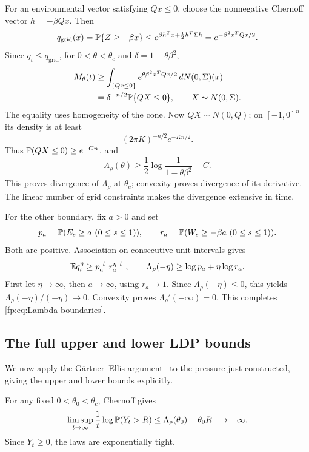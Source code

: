 For an environmental vector satisfying $Qx\le0$, choose the nonnegative Chernoff vector $h=-\beta Qx$. Then
\begin{equation}\label{fp:eq:chernoff-cone}
 q_{\mathrm{grid}}(x)=\mathbb P\{Z\ge-\beta x\}
 \le e^{\beta h^Tx+\frac12h^T\Sigma h}
 =e^{-\beta^2x^TQx/2}.
\end{equation}
Since $q_t\le q_{\mathrm{grid}}$, for $0<\theta<\theta_c$ and $\delta=1-\theta\beta^2$,
\begin{align}
 M_\theta(t)
 &\ge\int_{\{Qx\le0\}}e^{\theta\beta^2x^TQx/2}\,dN(0,\Sigma)(x)\notag\\
 &=\delta^{-n/2}\mathbb P\{QX\le0\},\qquad X\sim N(0,\Sigma).\label{fp:eq:boundary-integral}
\end{align}
The equality uses homogeneity of the cone. Now $QX\sim N(0,Q)$; on $[-1,0]^n$ its density is at least
\[
 (2\pi K)^{-n/2}e^{-Kn/2}.
\]
Thus $\mathbb P(QX\le0)\ge e^{-Cn}$, and
\begin{equation}\label{fp:eq:boundary-divergence}
 \Lambda_\rho(\theta)
 \ge\frac12\log\frac1{1-\theta\beta^2}-C.
\end{equation}
This proves divergence of $\Lambda_\rho$ at $\theta_c$; convexity proves divergence of its derivative. The linear number of grid constraints makes the divergence extensive in time.

For the other boundary, fix $a>0$ and set
\[
 p_a=\mathbb P(E_s\ge a\ (0\le s\le1)),\qquad
 r_a=\mathbb P(W_s\ge-\beta a\ (0\le s\le1)).
\]
Both are positive. Association on consecutive unit intervals gives
\[
 \mathbb E q_t^\eta\ge p_a^{\lceil t\rceil}r_a^{\eta\lceil t\rceil},
 \qquad \Lambda_\rho(-\eta)\ge\log p_a+\eta\log r_a.
\]
First let $\eta\to\infty$, then $a\to\infty$, using $r_a\to1$. Since $\Lambda_\rho(-\eta)\le0$, this yields $\Lambda_\rho(-\eta)/(-\eta)\to0$. Convexity proves $\Lambda_\rho'(-\infty)=0$. This completes \eqref{fp:eq:Lambda-boundaries}.

\subsection{The full upper and lower LDP bounds}
We now apply the G\"artner--Ellis argument~\cite{DemboZeitouni2010}
to the pressure just constructed, giving the upper and lower bounds
explicitly.

For any fixed $0<\theta_0<\theta_c$, Chernoff gives
\[
 \limsup_{t\to\infty}\frac1t\log\mathbb P(Y_t>R)
 \le\Lambda_\rho(\theta_0)-\theta_0R\longrightarrow-\infty.
\]
Since $Y_t\ge0$, the laws are exponentially tight.

